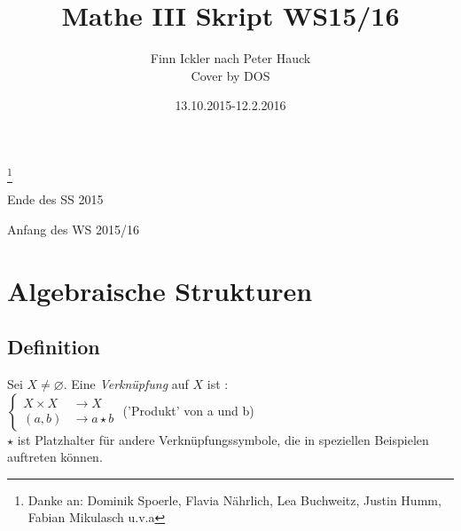 
\usepackage{tocloft}
\usepackage{pdfpages}

\renewcommand\cfttoctitlefont{\hfill\Large\bfseries}
\renewcommand\cftaftertoctitle{\hfill\mbox{}}


\author{Finn Ickler nach Peter Hauck\\ Cover by DOS}
\title{Mathe III Skript WS15/16}
\date{13.10.2015-12.2.2016}
\maketitle
\vfill
\thanks{Danke an: Dominik Spoerle, Flavia Nährlich, Lea Buchweitz, Justin Humm, Fabian Mikulasch u.v.a}
\resetHeadWidth
\newpage
\tableofcontents
\listoffigures
\clearpage
\setcounter{section}{-1}
\begin{center}
\Huge Ende des SS 2015
\end{center}

\newpage
\begin{center}
\Huge Anfang des WS 2015/16
\end{center}\section{Algebraische Strukturen}
\subsection{Definition}\label{sec:1.1}
Sei $X \neq \varnothing$. Eine \emph{Verknüpfung} auf $X$ ist : \\ $\begin{cases}
X \times X &\longrightarrow X\\
(a,b) &\longrightarrow a \star b
\end{cases}$ ('Produkt' von a und b)\\
$\star$ ist Platzhalter für andere Verknüpfungssymbole, die in speziellen Beispielen auftreten können.
